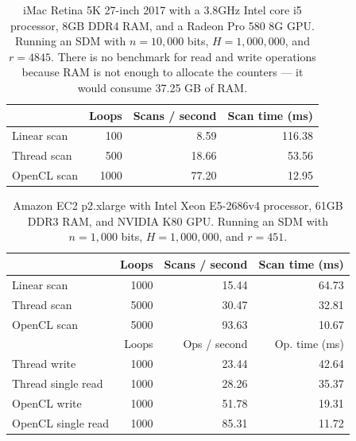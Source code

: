 \begin{table}[!htb]
\centering
\begin{tabular}{| l | r | r | r |}
    \hline
    & Loops & Scans / second & Scan time (ms) \\ \hline
    Linear scan & 100 & 8.59 & 116.38 \\
    Thread scan & 500 & 18.66 & 53.56 \\
    OpenCL scan & 1000 & 77.20 & 12.95 \\
    \hline
\end{tabular}
\caption{iMac Retina 5K 27-inch 2017 with a 3.8GHz Intel core i5 processor, 8GB DDR4 RAM, and a Radeon Pro 580 8G GPU. Running an SDM with $n=10,000$ bits, $H=1,000,000$, and $r=4845$.  There is no benchmark for read and write operations because RAM is not enough to allocate the counters --- it would consume 37.25 GB of RAM.
\label{tab:perf-imac-10k}}
\end{table}

\begin{table}[!htb]
\centering
\begin{tabular}{| l | r | r | r |}
    \hline
    & Loops & Scans / second & Scan time (ms) \\ \hline
    Linear scan & 1000 & 15.44 & 64.73 \\
    Thread scan & 5000 & 30.47 & 32.81 \\
    OpenCL scan & 5000 & 93.63 & 10.67 \\ \hline
    \hline
    & Loops & Ops / second & Op. time (ms) \\ \hline
    Thread write & 1000 & 23.44 & 42.64 \\
    Thread single read & 1000 & 28.26 & 35.37 \\
    OpenCL write & 1000 & 51.78 & 19.31 \\
    OpenCL single read & 1000 & 85.31 & 11.72 \\
    \hline
\end{tabular}
\caption{Amazon EC2 p2.xlarge with Intel Xeon E5-2686v4 processor, 61GB DDR3 RAM, and NVIDIA K80 GPU. Running an SDM with $n=1,000$ bits, $H=1,000,000$, and $r=451$.}
\end{table}


